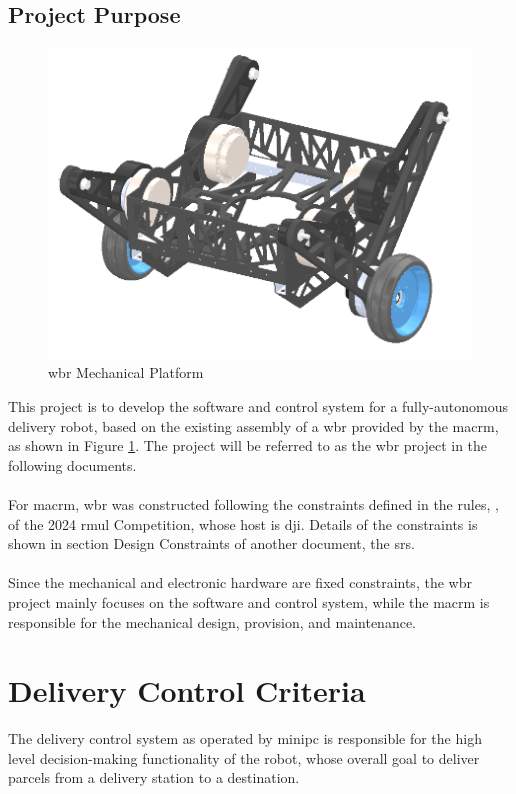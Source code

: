 \documentclass[12pt]{article}
\begin{document}
\subsection{Project Purpose} \label{sec:Project Purpose}
\begin{figure}[H]
    \centering
    \includegraphics[scale=0.7]{../Mechanical Platform.png}
    \caption{\acrshort{wbr} Mechanical Platform}
    \label{fig:Mechanical Platform}
\end{figure}
This project is to develop the software and control system for a fully-autonomous delivery robot, based on the existing assembly of a \acrfull{wbr} provided by the \acrfull{macrm}, as shown in Figure \ref{fig:Mechanical Platform}. The project will be referred to as the \acrshort{wbr} project in the following documents.\\\\
For \acrshort{macrm}, \acrshort{wbr} was constructed following the constraints defined in the rules, \citet{RmuBuildSpecs2024}, of the 2024 \acrfull{rmul} Competition, whose host is \acrfull{dji}. Details of the constraints is shown in section Design Constraints of another document, the \gls{srs}.\\\\
Since the mechanical and electronic hardware are fixed constraints, the \acrshort{wbr} project mainly focuses on the software and control system, while the \acrshort{macrm} is responsible for the mechanical design, provision, and maintenance.

\section{Delivery Control Criteria}
    The delivery control system as operated by \acrshort{minipc} is responsible for the high level decision-making functionality of the robot, whose overall goal to deliver parcels from a delivery station to a destination.
\end{document}
